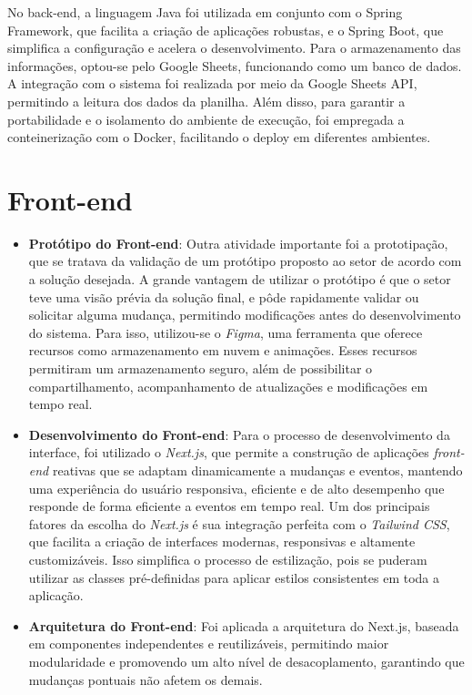 No back-end, a linguagem Java foi utilizada em conjunto com o Spring Framework, que facilita a criação de aplicações robustas, e o Spring Boot, que simplifica a configuração e acelera o desenvolvimento. Para o armazenamento das informações, optou-se pelo Google Sheets, funcionando como um banco de dados. A integração com o sistema foi realizada por meio da Google Sheets API, permitindo a leitura dos dados da planilha. Além disso, para garantir a portabilidade e o isolamento do ambiente de execução, foi empregada a conteinerização com o Docker, facilitando o deploy em diferentes ambientes.

\section{Front-end}

\begin{itemize}
    \item \textbf{Protótipo do Front-end}: Outra atividade importante foi a prototipação, que se tratava da validação de um protótipo proposto ao setor de acordo com a solução desejada. A grande vantagem de utilizar o protótipo é que o setor teve uma visão prévia da solução final, e pôde rapidamente validar ou solicitar alguma mudança, permitindo modificações antes do desenvolvimento do sistema. Para isso, utilizou-se o \textit{Figma}, uma ferramenta que oferece recursos como armazenamento em nuvem e animações. Esses recursos permitiram um armazenamento seguro, além de possibilitar o compartilhamento, acompanhamento de atualizações e modificações em tempo real.
    
    \item \textbf{Desenvolvimento do Front-end}: Para o processo de desenvolvimento da interface, foi utilizado o \textit{Next.js}, que permite a construção de aplicações \textit{front-end} reativas que se adaptam dinamicamente a mudanças e eventos, mantendo uma experiência do usuário responsiva, eficiente e de alto desempenho que responde de forma eficiente a eventos em tempo real. Um dos principais fatores da escolha do \textit{Next.js} é sua integração perfeita com o \textit{Tailwind CSS}, que facilita a criação de interfaces modernas, responsivas e altamente customizáveis. Isso simplifica o processo de estilização, pois se puderam utilizar as classes pré-definidas para aplicar estilos consistentes em toda a aplicação.

    \item \textbf{Arquitetura do Front-end}: Foi aplicada a arquitetura do Next.js, baseada em componentes independentes e reutilizáveis, permitindo maior modularidade e promovendo um alto nível de desacoplamento, garantindo que mudanças pontuais não afetem os demais.
\end{itemize}

